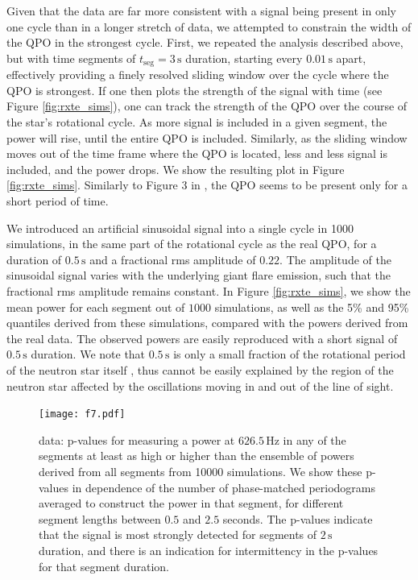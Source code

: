 \documentclass{emulateapj}
\begin{document}
Given that the data are far more consistent with a signal being present in only one cycle than in a longer stretch of data, we attempted to constrain the width of the QPO in the strongest cycle. First, we repeated the analysis described above, but with time segments of $t_{\mathrm{seg}} = 3 \, \mathrm{s}$ duration, starting every $0.01\,\mathrm{s}$ apart, effectively providing a finely resolved sliding window over the cycle where the QPO is strongest. If one then plots the strength of the signal with time (see Figure \ref{fig:rxte_sims}), one can track the strength of the QPO over the course of the star's rotational cycle. As more signal is included in a given segment, the power will rise, until the entire QPO is included. Similarly, as the sliding window moves out of the time frame where the QPO is located, less and less signal is included, and the power drops. We show the resulting plot in Figure \ref{fig:rxte_sims}. Similarly to Figure 3 in \citet{Strohmayer06}, the QPO seems to be present only for a short period of time. 

We introduced an artificial sinusoidal signal into a single cycle in 1000 simulations, in the same part of the rotational cycle as the real QPO, for a duration of $0.5\, \mathrm{s}$ and a fractional rms amplitude of $0.22$. The amplitude of the sinusoidal signal varies with the underlying giant flare emission, such that the fractional rms amplitude remains constant. In Figure \ref{fig:rxte_sims}, we show the mean power for each segment out of $1000$ simulations, as well as the 5\% and 95\% quantiles derived from these simulations, compared with the powers derived from the real data. The observed powers are easily reproduced with a short signal of $0.5\, \mathrm{s}$ duration. We note that $0.5\,\mathrm{s}$ is only a small fraction of the rotational period of the neutron star itself \citep[$7.5477 \,\mathrm{s}$,][]{Woods07}, thus cannot be easily explained by the region of the neutron star affected by the oscillations moving in and out of the line of sight.
\begin{figure}[htbp]
\begin{center}
\texttt{[image: f7.pdf]}
\caption{\rhessi data: p-values for measuring a power at $626.5\, \mathrm{Hz}$ in any of the segments at least as high or higher than the ensemble of powers derived from all segments from 10000 simulations. We show these p-values in dependence of the number of phase-matched periodograms averaged to construct the power in that segment, for different segment lengths between $0.5$ and $2.5$ seconds. The p-values indicate that the signal is most strongly detected for segments of $2\,\mathrm{s}$ duration, and there is an indication for intermittency in the p-values for that segment duration.}
\label{fig:rhessi_pvalues}
\end{center}
\end{figure}
\end{document}
